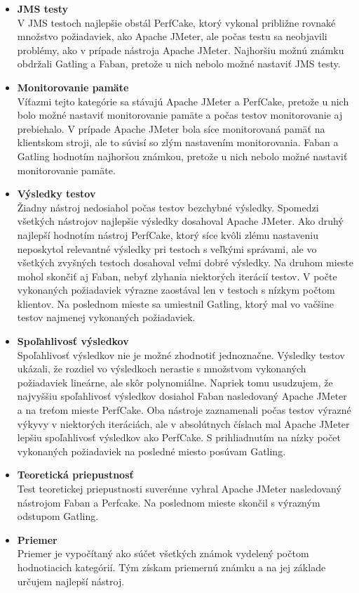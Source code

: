 \documentclass[12pt,oneside,final]{fithesis-utf8}
\begin{document}
\begin{itemize}
\item \textbf{JMS testy}\\
V JMS testoch najlepšie obstál PerfCake, ktorý vykonal približne rovnaké množstvo požiadaviek, ako Apache JMeter, ale počas testu sa neobjavili problémy, ako v prípade nástroja Apache JMeter. Najhoršiu možnú známku obdržali Gatling a Faban, pretože u nich nebolo možné nastaviť JMS testy.

\item \textbf{Monitorovanie pamäte}\\
Víťazmi tejto kategórie sa stávajú Apache JMeter a PerfCake, pretože u nich bolo možné nastaviť monitorovanie pamäte a počas testov monitorovanie aj prebiehalo. V prípade Apache JMeter bola síce monitorovaná pamäť na klientskom stroji, ale to súvisí so zlým nastavením monitorovania. Faban a Gatling hodnotím najhoršou známkou, pretože u nich nebolo možné nastaviť monitorovanie pamäte.

\item \textbf{Výsledky testov}\\
Žiadny nástroj nedosiahol počas testov bezchybné výsledky. Spomedzi všetkých nástrojov najlepšie výsledky dosahoval Apache JMeter. Ako druhý najlepší hodnotím nástroj PerfCake, ktorý síce kvôli zlému nastaveniu neposkytol relevantné výsledky pri testoch s veľkými správami, ale vo všetkých zvyšných testoch dosahoval veľmi dobré výsledky. Na druhom mieste mohol skončiť aj Faban, nebyť zlyhania niektorých iterácií testov. V počte vykonaných požiadaviek výrazne zaostával len v testoch s nízkym počtom klientov. Na poslednom mieste sa umiestnil Gatling, ktorý mal vo vačšine testov najmenej vykonaných požiadaviek.

\item \textbf{Spoľahlivosť výsledkov}\\
Spoľahlivosť výsledkov nie je možné zhodnotiť jednoznačne. Výsledky testov ukázali, že rozdiel vo výsledkoch nerastie s množstvom vykonaných požiadaviek lineárne, ale skôr polynomiálne. Napriek tomu usudzujem, že najvyššiu spoľahlivosť výsledkov dosiahol Faban nasledovaný Apache JMeter a na treťom mieste PerfCake. Oba nástroje zaznamenali počas testov výrazné výkyvy v niektorých iteráciách, ale v absolútnych číslach mal Apache JMeter lepšiu spoľahlivosť výsledkov ako PerfCake. S prihliadnutím na nízky počet vykonaných požiadaviek na posledné miesto posúvam Gatling.

\item \textbf{Teoretická priepustnosť}\\
Test teoretickej priepustnosti suverénne vyhral Apache JMeter nasledovaný nástrojom Faban a Perfcake. Na poslednom mieste skončil s výrazným odstupom Gatling.

\item \textbf{Priemer}\\
Priemer je vypočítaný ako súčet všetkých známok vydelený počtom hodnotiacich kategórií. Tým získam priemernú známku a na jej základe určujem najlepší nástroj.

\end{itemize}
\end{document}
